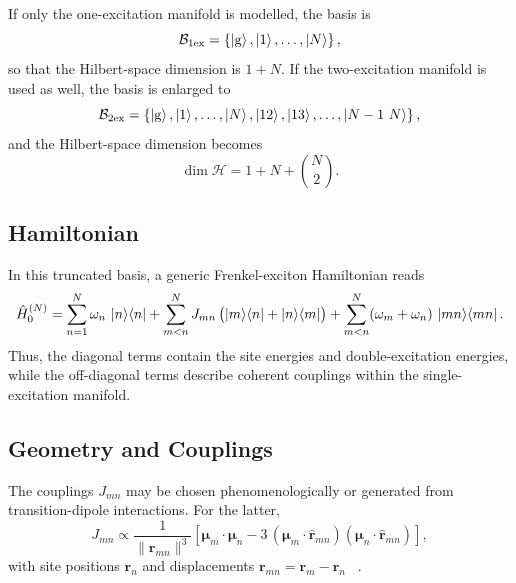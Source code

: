 If only the one-excitation manifold is modelled, the basis is
\begin{equation*}
\mathcal{B}_{1\mathrm{ex}} = \left\{ \ket{\mathrm{g}}, \ket{1}, \ldots, \ket{N} \right\},
\end{equation*}
so that the Hilbert-space dimension is \(1+N\). If the two-excitation manifold
is used as well, the basis is enlarged to
\begin{equation*}
\mathcal{B}_{2\mathrm{ex}} = \left\{ \ket{\mathrm{g}}, \ket{1}, \ldots, \ket{N}, \ket{12}, \ket{13}, \ldots, \ket{N-1~N} \right\},
\end{equation*}
and the Hilbert-space dimension becomes
\begin{equation*}
\dim \mathcal{H} = 1 + N + \binom{N}{2}.
\end{equation*}


\subsection{Hamiltonian}

In this truncated basis, a generic Frenkel-exciton Hamiltonian reads
\begin{equation*}
\hat{H}_{0}^{(N)}
=
\sum_{n=1}^{N}\omega_{n}\,\ket{n}\!\bra{n}
+
\sum_{m<n}^{N}J_{mn}\,\bigl(\ket{m}\!\bra{n}+\ket{n}\!\bra{m}\bigr)
+
\sum_{m<n}^{N}(\omega_{m}+\omega_{n})\,\ket{mn}\!\bra{mn}.
\end{equation*}
Thus, the diagonal terms contain the site energies and double-excitation
energies, while the off-diagonal terms describe coherent couplings within the
single-excitation manifold.

\subsection{Geometry and Couplings}

The couplings \(J_{mn}\) may be chosen phenomenologically or generated from
transition-dipole interactions. For the latter,
\begin{equation*}
J_{mn} \propto \frac{1}{\lVert \boldsymbol{r}_{mn} \rVert^{3}}
\left[
\boldsymbol{\mu}_{m}\cdot\boldsymbol{\mu}_{n}
- 3\,
(\boldsymbol{\mu}_{m}\cdot\hat{\boldsymbol{r}}_{mn})
(\boldsymbol{\mu}_{n}\cdot\hat{\boldsymbol{r}}_{mn})
\right],
\end{equation*}
with site positions \(\boldsymbol{r}_{n}\) and displacements
\(\boldsymbol{r}_{mn}=\boldsymbol{r}_{m}-\boldsymbol{r}_{n}\)
~\cite{griffiths2013introductionelectrodynamics,lehmberg1970radiationatomsystem,masters2014pathsforstersresonance}.


